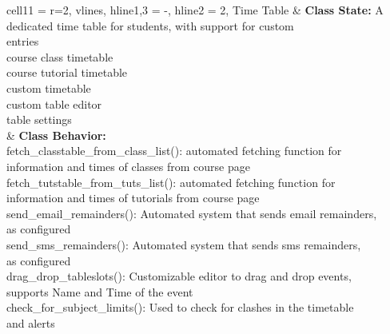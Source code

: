 \documentclass[11pt]{article}
\begin{document}
\begin{longtblr}[
  label = none,
  entry = none,
]{
  cell{1}{1} = {r=2}{},
  vlines,
  hline{1,3} = {-}{},
  hline{2} = {2}{},
}
Time Table & {\textbf{Class State:} A dedicated time table for students, with support for custom\\ entries\\
\hspace{\dimexpr\labelsep+0.5\tabcolsep}course class timetable\\
\hspace{\dimexpr\labelsep+0.5\tabcolsep}course tutorial timetable\\
\hspace{\dimexpr\labelsep+0.5\tabcolsep}custom timetable\\
\hspace{\dimexpr\labelsep+0.5\tabcolsep}custom table editor\\
\hspace{\dimexpr\labelsep+0.5\tabcolsep}table settings} \\
           & {\textbf{Class Behavior:}\\
\hspace{\dimexpr\labelsep+0.5\tabcolsep}fetch\_classtable\_from\_class\_list(): automated fetching function for\\
 information and times of classes from course page\\
\hspace{\dimexpr\labelsep+0.5\tabcolsep}fetch\_tutstable\_from\_tuts\_list(): automated fetching function for \\
information and times of tutorials from course page\\
\hspace{\dimexpr\labelsep+0.5\tabcolsep}send\_email\_remainders(): Automated system that sends email remainders,\\
 as configured\\
\hspace{\dimexpr\labelsep+0.5\tabcolsep}send\_sms\_remainders(): Automated system that sends sms remainders,\\
 as configured\\
\hspace{\dimexpr\labelsep+0.5\tabcolsep}drag\_drop\_tableslots(): Customizable editor to drag and drop events, \\
supports Name and Time of the event\\
\hspace{\dimexpr\labelsep+0.5\tabcolsep}check\_for\_subject\_limits(): Used to check for clashes in the timetable \\
and alerts}
\end{longtblr}
\end{document}
